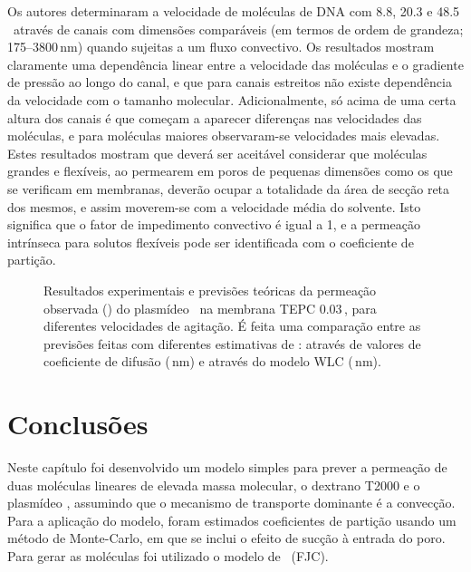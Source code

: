 %
Os autores determinaram a velocidade de moléculas de DNA com 8.8, 20.3 e 48.5\,\kilopb\ através de canais com dimensões comparáveis (em termos de ordem de grandeza; 175--3800\,nm) quando sujeitas a um fluxo convectivo. Os resultados mostram claramente uma dependência linear entre a velocidade das moléculas e o gradiente de pressão ao longo do canal, e que para canais estreitos não existe dependência da velocidade com o tamanho molecular. Adicionalmente, só acima de uma certa altura dos canais é que começam a aparecer diferenças nas velocidades das moléculas, e para moléculas maiores observaram-se velocidades mais elevadas. Estes resultados mostram que deverá ser aceitável considerar que moléculas grandes e flexíveis, ao permearem em poros de pequenas dimensões como os que se verificam em membranas, deverão ocupar a totalidade da área de secção reta dos mesmos, e assim moverem-se com a velocidade média do solvente. Isto significa que o fator de impedimento convectivo é igual a 1, e a permeação intrínseca para solutos flexíveis pode ser identificada com o coeficiente de partição. 

\begin{figure}
	\centering
	
	\caption[Permeação observada do plasmídeo \pUC\ na membrana TEPC 0.03\,\micro\meter]{Resultados experimentais e previsões teóricas da permeação observada (\permobs) do plasmídeo \pUC\ na membrana TEPC 0.03\,\micro\meter, para diferentes velocidades de agitação. É feita uma comparação entre as previsões feitas com diferentes estimativas de \distanciah: através de valores de coeficiente de difusão (\,nm) e através do modelo WLC (\,nm).}
	\label{fig:5art1}
\end{figure}

\section{Conclusões}
Neste capítulo foi desenvolvido um modelo simples para prever a permeação de duas moléculas lineares de elevada massa molecular, o dextrano T2000 e o plasmídeo \pUC, assumindo que o mecanismo de transporte dominante é a convecção. Para a aplicação do modelo, foram estimados coeficientes de partição usando um método de Monte-Carlo, em que se inclui o efeito de sucção à entrada do poro. Para gerar as moléculas foi utilizado o modelo de \fjc\ (FJC). 

